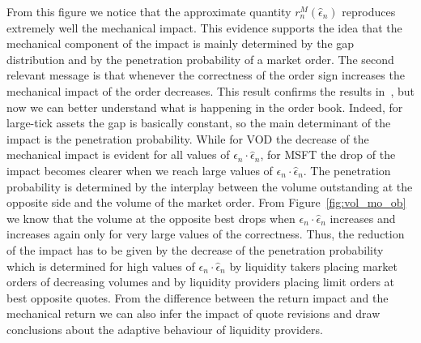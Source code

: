 \documentclass[12pt]{iopart}
\begin{document}
From this figure we notice that the approximate quantity $r_n^M(\hat{\epsilon}_n)$ reproduces extremely well the mechanical impact. This evidence supports the idea that the mechanical component of the impact is mainly determined by the gap distribution and by the penetration probability of a market order. The second relevant message is that whenever the correctness of the order sign increases the mechanical impact of the order decreases. This result confirms the results in~\cite{lillo2004long}, but now we can better understand what is happening in the order book. Indeed, for large-tick assets the gap is basically constant, so the main determinant of the impact is the penetration probability. While for VOD the decrease of the mechanical impact is evident for all values of $\epsilon_n\cdot\hat{\epsilon}_n$, for MSFT the drop of the impact becomes clearer when we reach large values of $\epsilon_n\cdot\hat{\epsilon}_n$. The penetration probability is determined by the interplay between the volume outstanding at the opposite side and the volume of the market order. From Figure~\ref{fig:vol_mo_ob} we know that the volume at the opposite best drops when $\epsilon_n\cdot\hat{\epsilon}_n$ increases and increases again only for very large values of the correctness. Thus, the reduction of the impact has to be given by the decrease of the penetration probability which is determined for high values of $\epsilon_n\cdot\hat{\epsilon}_n$ by liquidity takers placing market orders of decreasing volumes and by liquidity providers placing limit orders at best opposite quotes. From the difference between the return impact and the mechanical return we can also infer the impact of quote revisions and draw conclusions about the adaptive behaviour of liquidity providers. 
\end{document}
